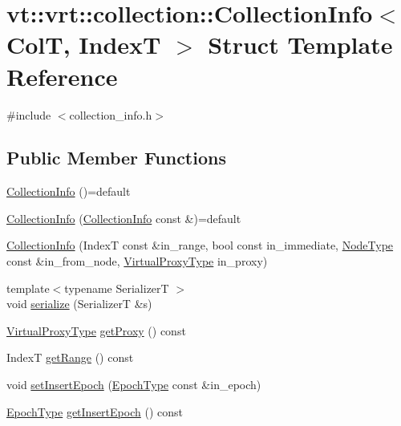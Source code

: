 \hypertarget{structvt_1_1vrt_1_1collection_1_1_collection_info}{}\section{vt\+:\+:vrt\+:\+:collection\+:\+:Collection\+Info$<$ ColT, IndexT $>$ Struct Template Reference}
\label{structvt_1_1vrt_1_1collection_1_1_collection_info}


{\ttfamily \#include $<$collection\+\_\+info.\+h$>$}

\subsection*{Public Member Functions}
\begin{DoxyCompactItemize}
\item 
\hyperlink{structvt_1_1vrt_1_1collection_1_1_collection_info_a92a25c0c5f12cc3e97b60ef8d011a348}{Collection\+Info} ()=default
\item 
\hyperlink{structvt_1_1vrt_1_1collection_1_1_collection_info_a8b280b46f8afe9a170d718c08d8d5a54}{Collection\+Info} (\hyperlink{structvt_1_1vrt_1_1collection_1_1_collection_info}{Collection\+Info} const \&)=default
\item 
\hyperlink{structvt_1_1vrt_1_1collection_1_1_collection_info_a8f1f1ea8fffa846772e35288afad5767}{Collection\+Info} (IndexT const \&in\+\_\+range, bool const in\+\_\+immediate, \hyperlink{namespacevt_a866da9d0efc19c0a1ce79e9e492f47e2}{Node\+Type} const \&in\+\_\+from\+\_\+node, \hyperlink{namespacevt_a1b417dd5d684f045bb58a0ede70045ac}{Virtual\+Proxy\+Type} in\+\_\+proxy)
\item 
{\footnotesize template$<$typename SerializerT $>$ }\\void \hyperlink{structvt_1_1vrt_1_1collection_1_1_collection_info_aca2483c9363bcdea2c50641eba714a27}{serialize} (SerializerT \&s)
\item 
\hyperlink{namespacevt_a1b417dd5d684f045bb58a0ede70045ac}{Virtual\+Proxy\+Type} \hyperlink{structvt_1_1vrt_1_1collection_1_1_collection_info_ab8b416dfab5de9f872c7588bd567cd3c}{get\+Proxy} () const
\item 
IndexT \hyperlink{structvt_1_1vrt_1_1collection_1_1_collection_info_a5f3641f40cadee9d13ca924adbd42071}{get\+Range} () const
\item 
void \hyperlink{structvt_1_1vrt_1_1collection_1_1_collection_info_a277ee82791f09d03c84bb6dd81051fca}{set\+Insert\+Epoch} (\hyperlink{namespacevt_a985a5adf291c34a3ca263b3378388236}{Epoch\+Type} const \&in\+\_\+epoch)
\item 
\hyperlink{namespacevt_a985a5adf291c34a3ca263b3378388236}{Epoch\+Type} \hyperlink{structvt_1_1vrt_1_1collection_1_1_collection_info_a9c81de9eeddd203f92d76d80b2e09e3c}{get\+Insert\+Epoch} () const
\end{DoxyCompactItemize}
